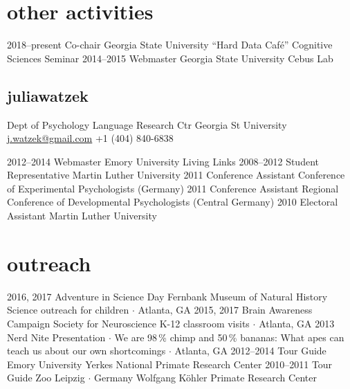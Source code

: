 \documentclass[]{friggeri-cv}
\begin{document}
\section{other activities}

\begin{entrylist}
  \entry
    {2018--present}
    {Co-chair}
    {Georgia State University}
    {``Hard Data Café'' Cognitive Sciences Seminar}
  \entry
    {2014--2015}
    {Webmaster}
    {Georgia State University}
    {Cebus Lab}
\end{entrylist}


\newpage
\thispagestyle{fancy}

\begin{aside}
  \section{{\normalfont julia}watzek}
    Dept of Psychology
    Language Research Ctr
    Georgia St University
    ~
    \href{mailto:j.watzek@gmail.com}{j.watzek@gmail.com}
    +1 (404) 840-6838
\end{aside}

\begin{entrylist}
  \entry
    {2012--2014}
    {Webmaster}
    {Emory University}
    {Living Links}
  \entry
    {2008--2012}
    {Student Representative}
    {}
    {Martin Luther University}
 \entry
   {2011}
   {Conference Assistant}
   {}
   {Conference of Experimental Psychologists (Germany)}
 \entry
   {2011}
   {Conference Assistant}
   {}
   {Regional Conference of Developmental Psychologists (Central Germany)}
 \entry
   {2010}
   {Electoral Assistant}
   {}
   {Martin Luther University}
\end{entrylist}


\section{outreach}

\begin{entrylist}
  \entry
    {2016, 2017}
    {Adventure in Science Day}
    {Fernbank Museum of Natural History}
    {Science outreach for children $\cdot$ Atlanta, GA}
  \entry
    {2015, 2017}
    {Brain Awareness Campaign}
    {Society for Neuroscience}
    {K-12 classroom visits $\cdot$ Atlanta, GA}
  \entry
    {2013}
    {Nerd Nite}
    {}
    {Presentation $\cdot$ We are 98\,\% chimp and 50\,\% bananas: What apes can teach us about our own shortcomings $\cdot$ Atlanta, GA}
  \entry
    {2012--2014}
    {Tour Guide}
    {Emory University}
    {Yerkes National Primate Research Center}
  \entry
    {2010--2011}
    {Tour Guide}
    {Zoo Leipzig $\cdot$ Germany}
    {Wolfgang K\"{o}hler Primate Research Center}
\end{entrylist}


\end{document}
